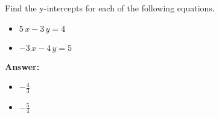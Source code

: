  Find the y-intercepts for each of the following equations. \begin{itemize}\item \( 5 \, x - 3 \, y = 4 \)\item \( -3 \, x - 4 \, y = 5 \)\end{itemize}

        \textbf{Answer:} \begin{itemize}\item \( -\frac{4}{3} \)\item \( -\frac{5}{4} \)\end{itemize}
